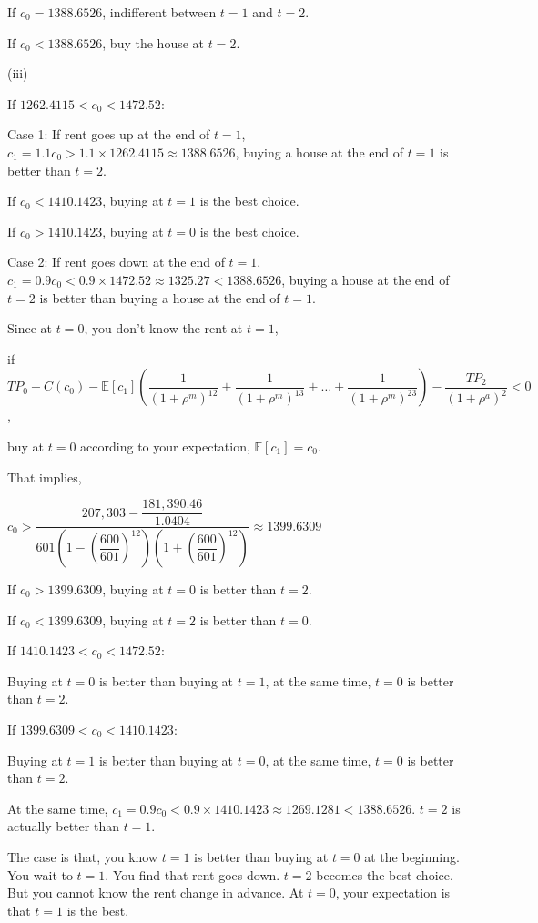 \documentclass{article}
\begin{document}
If $c_{0}=1388.6526$, indifferent between $t=1$ and $t=2$.

If $c_{0}<1388.6526$, buy the house at $t=2$.

(iii)

If $1262.4115<c_{0}<1472.52$:

Case 1: If rent goes up at the end of $t=1$, $c_{1}=1.1c_{0}>1.1\times1262.4115\approx1388.6526$, buying a house at the end of $t=1$ is better than $t=2$.

If $c_{0}<1410.1423$, buying at $t=1$ is the best choice.

If $c_{0}>1410.1423$, buying at $t=0$ is the best choice.

Case 2: If rent goes down at the end of $t=1$, $c_{1}=0.9c_{0}<0.9\times1472.52\approx1325.27<1388.6526$, buying a house at the end of $t=2$ is better than buying a house at the end of $t=1$.

Since at $t=0$, you don't know the rent at $t=1$,

if $TP_{0}-C\left(c_{0}\right)-\mathbb{E} \left[c_{1}\right]\left(\dfrac{1}{\left(1+\rho^{m}\right)^{12}}+\dfrac{1}{\left(1+\rho^{m}\right)^{13}}+\dots+\dfrac{1}{\left(1+\rho^{m}\right)^{23}}\right)-\dfrac{TP_{2}}{\left(1+\rho^{a}\right)^{2}}<0$, 

buy at $t=0$ according to your expectation, $\mathbb{E} \left[c_{1}\right]=c_{0}$.

That implies, 

$c_{0}>\dfrac{207,303-\dfrac{181,390.46}{1.0404}}{601\left(1-\left(\dfrac{600}{601}\right)^{12}\right)\left(1+\left(\dfrac{600}{601}\right)^{12}\right)}\approx\boxed{1399.6309}$

If $c_{0}>1399.6309$, buying at $t=0$ is better than $t=2$.

If $c_{0}<1399.6309$, buying at $t=2$ is better than $t=0$.

If $1410.1423<c_{0}<1472.52$:

Buying at $t=0$ is better than buying at $t=1$, at the same time, $t=0$ is better than $t=2$.

If $1399.6309<c_{0}<1410.1423$:

Buying at $t=1$ is better than buying at $t=0$, at the same time, $t=0$ is better than $t=2$.

At the same time, $c_{1}=0.9c_{0}<0.9\times1410.1423\approx1269.1281<1388.6526$. $t=2$ is actually better than $t=1$.

The case is that, you know $t=1$ is better than buying at $t=0$ at the beginning. You wait to $t=1$. You find that rent goes down. $t=2$ becomes the best choice. But you cannot know the rent change in advance. At $t=0$, your expectation is that $t=1$ is the best.
\end{document}
